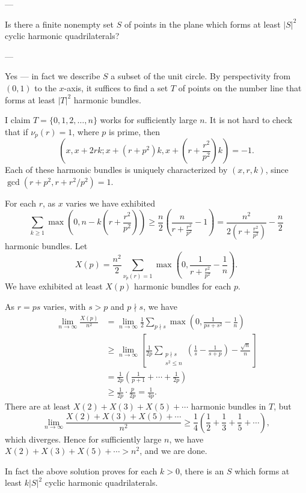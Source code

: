 
---

Is there a finite nonempty set $S$ of points in the plane which forms at least $|S|^2$ cyclic harmonic quadrilaterals?

---

Yes --- in fact we describe $S$ a subset of the unit circle. By perspectivity from $(0,1)$ to the $x$-axis, it suffices to find a set $T$ of points on the number line that forms at least $|T|^2$ harmonic bundles.

I claim $T=\{0,1,2,\ldots,n\}$ works for sufficiently large $n$. It is not hard to check that if $\nu_p(r)=1$, where $p$ is prime, then \[\left(x,x+2rk;x+\left(r+p^2\right)k,x+\left(r+\frac{r^2}{p^2}\right)k\right)=-1.\]
Each of these harmonic bundles is uniquely characterized by $(x,r,k)$, since $\gcd\left(r+p^2,r+r^2/p^2\right)=1$.

For each $r$, as $x$ varies we have exhibited \[\sum_{k\ge1}\max\left(0,n-k\left(r+\frac{r^2}{p^2}\right)\right)\ge\frac n2\left(\frac n{r+\frac{r^2}{p^2}}-1\right)=\frac{n^2}{2\left(r+\frac{r^2}{p^2}\right)}-\frac n2\]
harmonic bundles. Let \[X(p)=\frac{n^2}2\sum_{\nu_p(r)=1}\max\left(0,\frac1{r+\frac{r^2}{p^2}}-\frac1n\right).\]
We have exhibited at least $X(p)$ harmonic bundles for each $p$.

As $r=ps$ varies, with $s>p$ and $p\nmid s$, we have
\begin{align*}
    \lim_{n\to\infty}\frac{X(p)}{n^2}&=\lim_{n\to\infty}\frac12\sum_{p\nmid s}\max\left(0,\frac1{ps+s^2}-\frac1n\right)\\
    &\ge\lim_{n\to\infty}\left[\frac1{2p}\sum_{\substack{p\nmid s\\ s^2\le n}}\left(\frac1s-\frac1{s+p}\right)-\frac{\sqrt n}n\right]\\
    &=\frac1{2p}\left(\frac1{p+1}+\cdots+\frac1{2p}\right)\\
    &\ge\frac1{2p}\cdot\frac p{2p}=\frac1{4p}.
\end{align*}
There are at least $X(2)+X(3)+X(5)+\cdots$ harmonic bundles in $T$, but \[\lim_{n\to\infty}\frac{X(2)+X(3)+X(5)+\cdots}{n^2}\ge\frac14\left(\frac12+\frac13+\frac15+\cdots\right),\]
which diverges. Hence for sufficiently large $n$, we have $X(2)+X(3)+X(5)+\cdots>n^2$, and we are done.
\begin{boxremark}
    In fact the above solution proves for each $k>0$, there is an $S$ which forms at least $k|S|^2$ cyclic harmonic quadrilaterals.
\end{boxremark}

